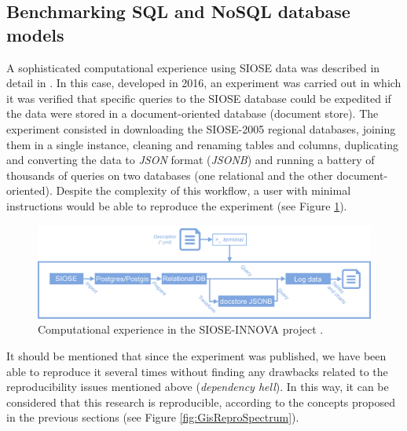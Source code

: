 \documentclass[ijgi,article,submit,moreauthors,pdftex]{Definitions/mdpi}
\begin{document}
\subsection{Benchmarking SQL and NoSQL database models}
\label{subsec:sql_nosql_workflow}

A sophisticated computational experience using SIOSE data was described in detail in \cite{NavarroCarrion2016}. In this case, developed in 2016, an experiment was carried out in which it was verified that specific queries to the SIOSE database could be expedited if the data were stored in a document-oriented database (document store). The experiment consisted in downloading the SIOSE-2005 regional databases, joining them in a single instance, cleaning and renaming tables and columns, duplicating and converting the data to \textit{JSON} format (\textit{JSONB}) and running a battery of thousands of queries on two databases (one relational and the other document-oriented). Despite the complexity of this workflow, a user with minimal instructions would be able to reproduce the experiment (see Figure \ref{fig:sql_nosql_workflow}).

\begin{figure}[!ht]
    \centering
    \includegraphics[scale=0.36]{images/fig5.pdf}
    \caption{Computational experience in the SIOSE-INNOVA project \cite{NavarroCarrion2016}.}
    \label{fig:sql_nosql_workflow}
\end{figure}

It should be mentioned that since the experiment was published, we have been able to reproduce it several times without finding any drawbacks related to the reproducibility issues mentioned above (\textit{dependency hell}). In this way, it can be considered that this research is reproducible, according to the concepts proposed in the previous sections (see Figure \ref{fig:GisReproSpectrum}).
\end{document}
